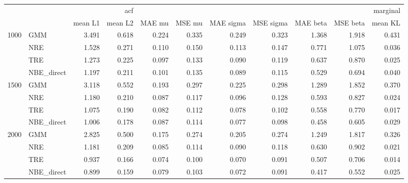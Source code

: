 \begin{tabular}{llrrrrrrrrr}
\toprule
 &  & \multicolumn{2}{r}{acf} & \multicolumn{7}{r}{marginal} \\
 &  & mean L1 & mean L2 & MAE mu & MSE mu & MAE sigma & MSE sigma & MAE beta & MSE beta & mean KL \\
\midrule
\multirow[t]{4}{*}{1000} & GMM & 3.491 & 0.618 & 0.224 & 0.335 & 0.249 & 0.323 & 1.368 & 1.918 & 0.431 \\
 & NRE & 1.528 & 0.271 & 0.110 & 0.150 & 0.113 & 0.147 & 0.771 & 1.075 & 0.036 \\
 & TRE & 1.273 & 0.225 & 0.097 & 0.133 & 0.090 & 0.119 & 0.637 & 0.870 & 0.025 \\
 & NBE_direct & 1.197 & 0.211 & 0.101 & 0.135 & 0.089 & 0.115 & 0.529 & 0.694 & 0.040 \\
\cline{1-11}
\multirow[t]{4}{*}{1500} & GMM & 3.118 & 0.552 & 0.193 & 0.297 & 0.225 & 0.298 & 1.289 & 1.852 & 0.370 \\
 & NRE & 1.180 & 0.210 & 0.087 & 0.117 & 0.096 & 0.128 & 0.593 & 0.827 & 0.024 \\
 & TRE & 1.075 & 0.190 & 0.082 & 0.112 & 0.078 & 0.102 & 0.558 & 0.770 & 0.017 \\
 & NBE_direct & 1.006 & 0.178 & 0.087 & 0.114 & 0.077 & 0.098 & 0.458 & 0.605 & 0.029 \\
\cline{1-11}
\multirow[t]{4}{*}{2000} & GMM & 2.825 & 0.500 & 0.175 & 0.274 & 0.205 & 0.274 & 1.249 & 1.817 & 0.326 \\
 & NRE & 1.181 & 0.209 & 0.085 & 0.114 & 0.090 & 0.118 & 0.630 & 0.902 & 0.021 \\
 & TRE & 0.937 & 0.166 & 0.074 & 0.100 & 0.070 & 0.091 & 0.507 & 0.706 & 0.014 \\
 & NBE_direct & 0.899 & 0.159 & 0.079 & 0.103 & 0.072 & 0.091 & 0.417 & 0.552 & 0.025 \\
\cline{1-11}
\bottomrule
\end{tabular}
